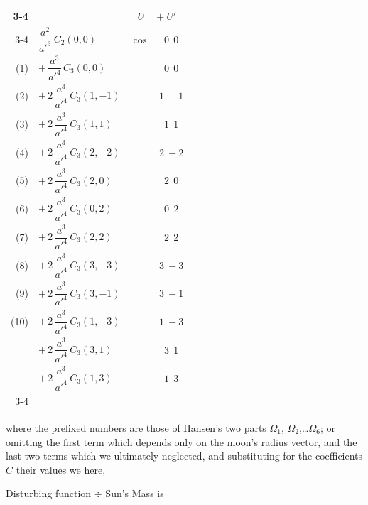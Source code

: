 \documentclass[12pt,a4paper]{article}
\theoremstyle{plain}
\begin{document}
\begin{center}
\begin{tabular}{rl|c|c|}
\cline{3-4}
   &                                                      & \multicolumn{2}{c|}{$U\quad+U'$} \\
\cline{3-4}
   & $\dfrac{a^{2}}{a'^{3}}\,C_{2}(0,0)$                  & $\cos$ & $0\ \ 0$ \\
(1)& $+\,\dfrac{a^{3}}{a'^{4}}\,C_{3}(0,0)$               &        & $0\ \ 0$ \\
(2)& $+\,2\,\dfrac{a^{3}}{a'^{4}}\,C_{3}(1,-1)$           &        & $1\ -1$ \\
(3)& $+\,2\,\dfrac{a^{3}}{a'^{4}}\,C_{3}(1,1)$            &        & $1\ \ 1$ \\
(4)& $+\,2\,\dfrac{a^{3}}{a'^{4}}\,C_{3}(2,-2)$           &        & $2\ -2$ \\
(5)& $+\,2\,\dfrac{a^{3}}{a'^{4}}\,C_{3}(2,0)$            &        & $2\ \ 0$ \\
(6)& $+\,2\,\dfrac{a^{3}}{a'^{4}}\,C_{3}(0,2)$            &        & $0\ \ 2$ \\
(7)& $+\,2\,\dfrac{a^{3}}{a'^{4}}\,C_{3}(2,2)$            &        & $2\ \ 2$ \\
(8)& $+\,2\,\dfrac{a^{3}}{a'^{4}}\,C_{3}(3,-3)$           &        & $3\ -3$ \\
(9)& $+\,2\,\dfrac{a^{3}}{a'^{4}}\,C_{3}(3,-1)$           &        & $3\ -1$ \\
(10)& $+\,2\,\dfrac{a^{3}}{a'^{4}}\,C_{3}(1,-3)$          &        & $1\ -3$ \\
   & $+\,2\,\dfrac{a^{3}}{a'^{4}}\,C_{3}(3,1)$            &        & $3\ \ 1$ \\
   & $+\,2\,\dfrac{a^{3}}{a'^{4}}\,C_{3}(1,3)$            &        & $1\ \ 3$ \\
\cline{3-4}
\end{tabular}
\end{center}

\medskip
\noindent where the prefixed numbers are those of Hansen's two parts $\Omega_{1}$, $\Omega_{2}$,\ldots $\Omega_{6}$; or omitting the first term which depends only on the moon's radius vector, and the last two terms which we ultimately neglected, and substituting for the coefficients $C$ their values we here,

\newpage
{} Disturbing function $\div$ Sun's Mass is
\end{document}
